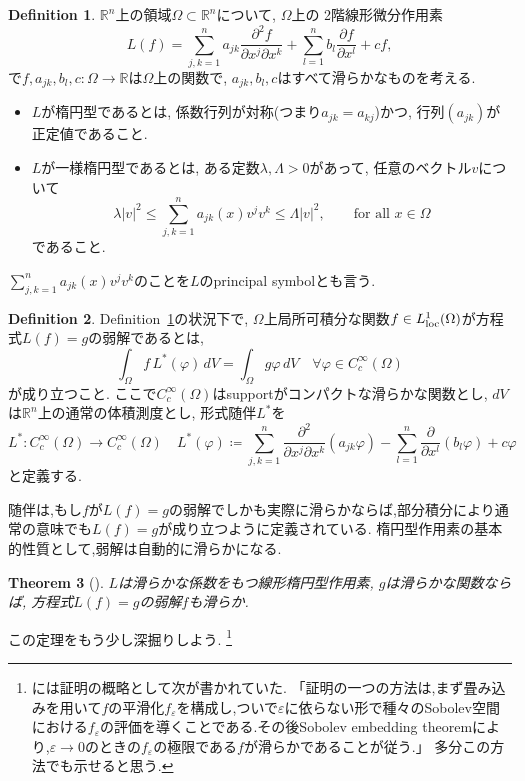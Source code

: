 \documentclass[dvipdfmx,a4paper,11pt]{article} %
\newtheorem{thm}{Theorem}[section]
\theoremstyle{definition}
\newtheorem{defn}[thm]{Definition}
\theoremstyle{remark}
\numberwithin{equation}{section}
\newcommand{\loc}{{\rm loc}}
\newcommand{\R}{\mathbb{R}}
\begin{document}
\begin{defn}
\label{defn-Sze-elliptic}
$\R^n$上の領域$\Omega\subset\mathbb{R}^n$について, $\Omega$上の
2階線形微分作用素
\[
L(f)=\sum_{j,k=1}^n a_{jk}\frac{\partial^2 f}{\partial x^j\partial x^k}
+\sum_{l=1}^n b_l\frac{\partial f}{\partial x^l}+cf,
\]
で$f,a_{jk},b_l,c\colon \Omega\to\mathbb{R}$は$\Omega$上の関数で,
$a_{jk},b_l,c$はすべて滑らかなものを考える. 
\begin{itemize}
\item $L$が楕円型であるとは, 係数行列が対称(つまり$a_{jk}=a_{kj}$)かつ, 行列$(a_{jk})$が正定値であること. 
\item $L$が一様楕円型であるとは, ある定数$\lambda,\Lambda>0$があって, 任意のベクトル$v$について
\[
\lambda\lvert v\rvert^2\leq \sum_{j,k=1}^n a_{jk}(x)v^jv^k \leq \Lambda\lvert v\rvert^2,\qquad \text{for all }x\in\Omega
\]
であること. 
\end{itemize}
\end{defn}
$\sum_{j,k=1}^n a_{jk}(x)v^jv^k $のことを$L$のprincipal symbolとも言う. 

\begin{defn}
Definition~\ref{defn-Sze-elliptic}の状況下で, 
 $\Omega$上局所可積分な関数$f \in L^{1}_{\loc}(\Omega)$が方程式$L(f)=g$の弱解であるとは,
\[
\int_\Omega f\,L^*(\varphi)\,dV=\int_\Omega g\varphi\,dV
\quad \forall \varphi \in C^{\infty}_{c}(\Omega)
\]
が成り立つこと. 
ここで$C^{\infty}_{c}(\Omega)$はsupportがコンパクトな滑らかな関数とし, 
$dV$は$\mathbb{R}^n$上の通常の体積測度とし, 形式随伴$L^*$を
\[
L^* \colon C^{\infty}_{c}(\Omega) \to C^{\infty}_{c}(\Omega)
\quad
L^*(\varphi )\coloneqq \sum_{j,k=1}^n \frac{\partial^2}{\partial x^j\partial x^k}(a_{jk}\varphi )
-\sum_{l=1}^n \frac{\partial}{\partial x^l}(b_l \varphi )+c\varphi 
\]
と定義する. 
\end{defn}

随伴は,もし$f$が$L(f)=g$の弱解でしかも実際に滑らかならば,部分積分により通常の意味でも$L(f)=g$が成り立つように定義されている.
楕円型作用素の基本的性質として,弱解は自動的に滑らかになる.

\begin{thm}[{\cite[Theorem 2.5]{Sze14}}]
\label{thm-Sze-2.5}
$L$は滑らかな係数をもつ線形楕円型作用素, $g$は滑らかな関数ならば, 
方程式$L(f)=g$の弱解$f$も滑らか. 
\end{thm}
この定理をもう少し深掘りしよう. 
\footnote{\cite[Theorem 2.5]{Sze14}には証明の概略として次が書かれていた. 
「証明の一つの方法は,まず畳み込みを用いて$f$の平滑化$f_\varepsilon$を構成し,ついで$\varepsilon$に依らない形で種々のSobolev空間における$f_\varepsilon$の評価を導くことである.その後Sobolev embedding theoremにより,$\varepsilon\to 0$のときの$f_\varepsilon$の極限である$f$が滑らかであることが従う.」 多分この方法でも示せると思う.}
\end{document}

